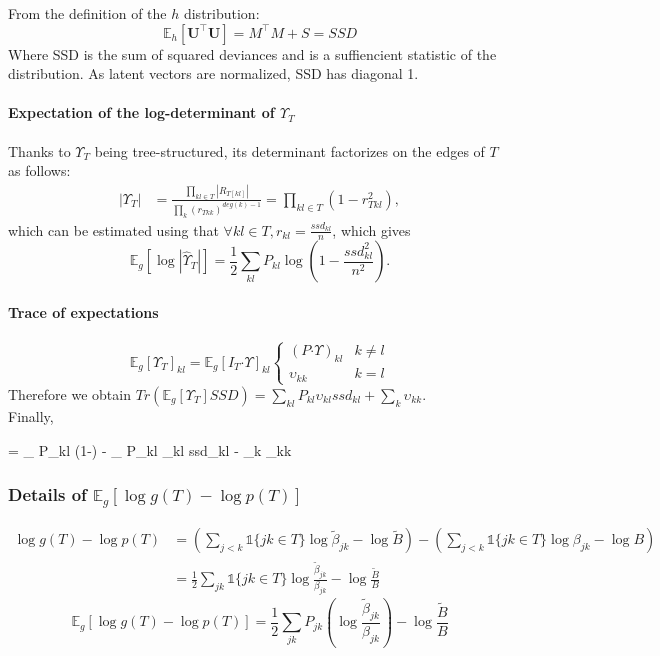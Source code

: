 \documentclass[11pt,a4paper]{article}
\newcommand*\lesswidefbox[1]{\fbox{\hspace{2em}#1\hspace{2em}}}
\newcommand{\Ubf}{\boldsymbol{U}}
\newcommand{\Esp}{\mathds{E}}
\newcommand{\had}{\boldsymbol{\cdot}}
\begin{document}
From the definition of the $h$ distribution: $$ \Esp_h[\Ubf^\intercal \Ubf] = M^\intercal M + S = SSD$$
 Where SSD is the sum of squared deviances and is a suffiencient statistic of the distribution. As latent vectors are normalized, SSD has diagonal 1.
 
\paragraph{Expectation of the log-determinant of $\Upsilon_T$\\}
Thanks to $\Upsilon_T$ being tree-structured, its determinant factorizes on the edges of $T$ as follows:
\begin{align*}
|\Upsilon_T| &=\frac{ \prod_{kl \in T} |R_{T[kl]}|}{\prod_k (r_{Tkk})^{deg(k)-1}} =  \prod_{kl \in T} (1-r_{Tkl}^2),
 \end{align*}
 which can be estimated using that $\forall kl \in T, r_{kl} = \frac{ssd_{kl}}{n}$,
 which gives $$\Esp_g[\log|\hat{\Upsilon}_T|]=\frac{1}{2}\sum_{kl} P_{kl}\log(1-\frac{ssd_{kl}^2}{n^2}).$$
\paragraph{Trace of expectations\\}
  \[ \Esp_g[\Upsilon_T]_{kl}  =  \Esp_g[I_T\had\Upsilon]_{kl} \left\{ 
\begin{array}{cc}
(P \had \Upsilon)_{kl} & k \neq l\\
\upsilon_{kk} & k = l
\end{array}
\right.
\]
Therefore we obtain $Tr(\Esp_g[\Upsilon_T] SSD) = \sum_{kl} P_{kl} \upsilon_{kl} ssd_{kl} + \sum_k \upsilon_{kk} $.\\

Finally, 
\begin{empheq}[box=\lesswidefbox]{align*}
\Esp_{gh} [\log p(\Ubf \mid T)] =  \sum _{} P_{kl} \log \Big(1-\Big) - \sum_{} P_{kl} \upsilon_{kl} ssd_{kl} -  \sum_{k} \upsilon_{kk} 
 \end{empheq}
\subsubsection{Details of $\Esp_g[\log g(T) - \log p(T)]$}
\begin{align*}
\log g(T) - \log p(T) &= \left(  \sum_{j<k} \mathds{1}\{jk \in T\} \log \widetilde{\beta}_{jk} - \log \widetilde{B}\right) - \left(  \sum_{j<k} \mathds{1}\{jk \in T\} \log {\beta}_{jk} - \log {B}\right)\\
&=\frac{1}{2}\sum_{jk} \mathds{1}\{jk \in T\} \log \frac{\widetilde{\beta}_{jk}}{{\beta}_{jk}} - \log \frac{\widetilde{B}}{B}
\end{align*}
$$\boxed{
\Esp_g[\log g(T) - \log p(T)] = \frac{1}{2}\sum_{jk}P_{jk} \left(\log \frac{\widetilde{\beta}_{jk}}{{\beta}_{jk}}\right) - \log \frac{\widetilde{B}}{B} }$$
\end{document}
